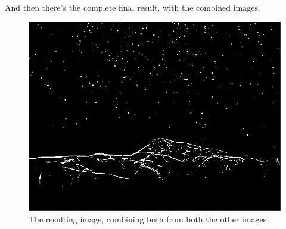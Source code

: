 And then there's the complete final result, with the combined images.
\begin{figure}[H]
	\centering
	\includegraphics[width=0.6\linewidth]{figure/finalGradient}
	\caption{The resulting image, combining both from both the other images.}
	\label{fig:finalGradient}
\end{figure}

